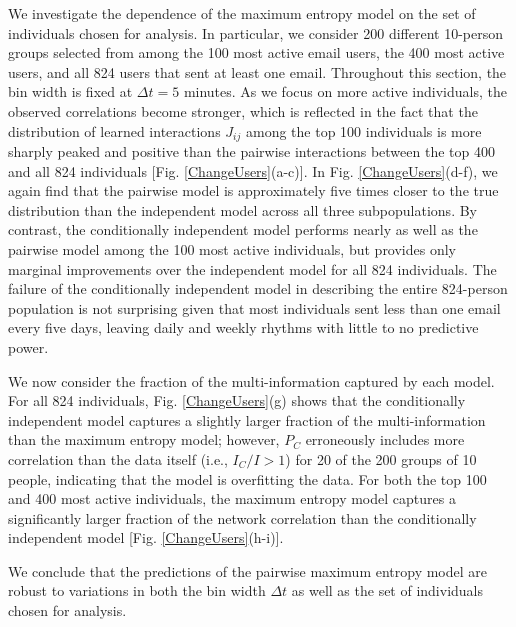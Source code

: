 \documentclass[aps,reprint,superscriptaddress,amsmath,amssymb,longbibliography]{revtex4-1}
\begin{document}
We investigate the dependence of the maximum entropy model on the set of individuals chosen for analysis. In particular, we consider 200 different 10-person groups selected from among the 100 most active email users, the 400 most active users, and all 824 users that sent at least one email. Throughout this section, the bin width is fixed at $\Delta t = 5$ minutes. As we focus on more active individuals, the observed correlations become stronger, which is reflected in the fact that the distribution of learned interactions $J_{ij}$ among the top 100 individuals is more sharply peaked and positive than the pairwise interactions between the top 400 and all 824 individuals [Fig. \ref{ChangeUsers}(a-c)]. In Fig. \ref{ChangeUsers}(d-f), we again find that the pairwise model is approximately five times closer to the true distribution than the independent model across all three subpopulations. By contrast, the conditionally independent model performs nearly as well as the pairwise model among the 100 most active individuals, but provides only marginal improvements over the independent model for all 824 individuals. The failure of the conditionally independent model in describing the entire 824-person population is not surprising given that most individuals sent less than one email every five days, leaving daily and weekly rhythms with little to no predictive power.

We now consider the fraction of the multi-information captured by each model. For all 824 individuals, Fig. \ref{ChangeUsers}(g) shows that the conditionally independent model captures a slightly larger fraction of the multi-information than the maximum entropy model; however, $P_C$ erroneously includes more correlation than the data itself (i.e., $I_C/I > 1$) for 20 of the 200 groups of 10 people, indicating that the model is overfitting the data. For both the top 100 and 400 most active individuals, the maximum entropy model captures a significantly larger fraction of the network correlation than the conditionally independent model [Fig. \ref{ChangeUsers}(h-i)].

We conclude that the predictions of the pairwise maximum entropy model are robust to variations in both the bin width $\Delta t$ as well as the set of individuals chosen for analysis.
\end{document}
